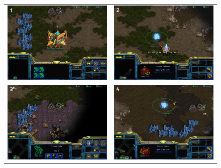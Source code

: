 \begin{figure}[!ht]
\begin{center}
\begin{tabular}{cc}
\includegraphics[width=0.48\columnwidth]{images/SC_game/SC_start_game.png} &
\includegraphics[width=0.48\columnwidth]{images/SC_game/SC_first_gate.png} \\
\includegraphics[width=0.48\columnwidth]{images/SC_game/SC_scout_opponent.png} & 
\includegraphics[width=0.48\columnwidth]{images/SC_game/SC_expand.png} \\ 

\end{tabular}
\end{center}
\end{figure}
